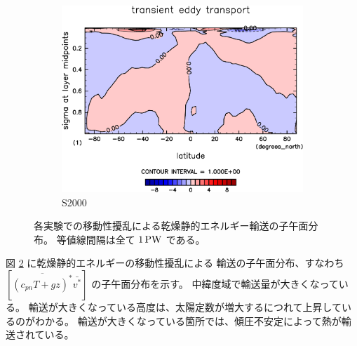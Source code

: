 \documentclass[body]{subfiles}
\begin{document}
\begin{figure}[t]
\begin{subfigure}{.4\textwidth}
		\centering
		\includegraphics[width=\columnwidth]{S2000/MeriHeatTransTest@dryStatEn_TE,time=7300:7665-crop-rotate.pdf}
		\caption{S2000}\label{乾燥静的エネルギー移動性擾乱S2000}
	\end{subfigure}
	\caption[各実験での移動性擾乱に依る乾燥静的エネルギー輸送の子午面分布]{
		各実験での移動性擾乱による乾燥静的エネルギー輸送の子午面分布。
		等値線間隔は全て \(1\hmu{PW}\) である。
	}\label{乾燥静的エネルギー移動性擾乱}
\end{figure}

図 \ref{乾燥静的エネルギー移動性擾乱} に乾燥静的エネルギーの移動性擾乱による
輸送の子午面分布、すなわち \([\overline{(c_{pn}T+gz)^*}\bar{v^*}]\) の子午面分布を示す。
中緯度域で輸送量が大きくなっている。
輸送が大きくなっている高度は、太陽定数が増大するにつれて上昇しているのがわかる。
輸送が大きくなっている箇所では、傾圧不安定によって熱が輸送されている。
\end{document}
